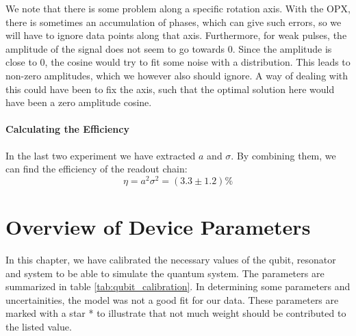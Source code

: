 We note that there is some problem along a specific rotation axis. With the OPX, there is sometimes an accumulation of phases, which can give such errors, so we will have to ignore data points along that axis. Furthermore, for weak pulses, the amplitude of the signal does not seem to go towards 0. Since the amplitude is close to 0, the cosine would try to fit some noise with a distribution. This leads to non-zero amplitudes, which we however also should ignore. A way of dealing with this could have been to fix the axis, such that the optimal solution here would have been a zero amplitude cosine. 


\paragraph{Calculating the Efficiency}
In the last two experiment we have extracted $a$ and $\sigma$. By combining them, we can find the efficiency of the readout chain:
\begin{equation}
    \eta = a^2\sigma^2 = (3.3 \pm 1.2) \% 
\end{equation}








\FloatBarrier
\section{Overview of Device Parameters}
In this chapter, we have calibrated the necessary values of the qubit, resonator and system to be able to simulate the quantum system. The parameters are summarized in table \ref{tab:qubit_calibration}. In determining some parameters and uncertainities, the model was not a good fit for our data. These parameters are marked with a star * to illustrate that not much weight should be contributed to the listed value.


